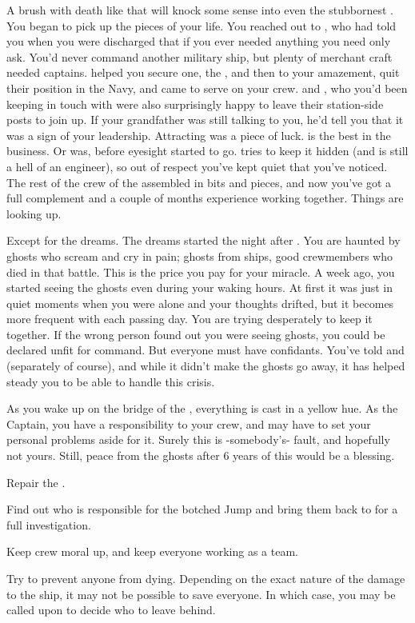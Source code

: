 \documentclass[char]{TMFHope}
\begin{document}
A brush with death like that will knock some sense into even the stubbornest \cCap{\human}. You began to pick up the pieces of your life. You reached out to \cXO{}, who had told you when you were discharged that if you ever needed anything you need only ask. You'd never command another military ship, but plenty of merchant craft needed captains. \cXO{} helped you secure one, the \pNew{}, and then to your amazement, quit their position in the Navy, and came to serve on your crew. \cMed{} and \cSci{}, who you'd been keeping in touch with were also surprisingly happy to leave their station-side posts to join up. If your grandfather was still talking to you, he'd tell you that it was a sign of your leadership. Attracting \cEng{} was a piece of luck. \cEng{\They} is the best in the business. Or was, before \cEng{\their} eyesight started to go. \cEng{} tries to keep it hidden (and \cEng{\they} is still a hell of an engineer), so out of respect you've kept quiet that you've noticed. The rest of the crew of the \pNew{} assembled in bits and pieces, and now you've got a full complement and a couple of months experience working together. Things are looking up.

Except for the dreams. The dreams started the night after \pBattle{}. You are haunted by ghosts who scream and cry in pain; ghosts from \pPlan{} ships, good crewmembers who died in that battle. This is the price you pay for your miracle.	A week ago, you started seeing the ghosts even during your waking hours. At first it was just in quiet moments when you were alone and your thoughts drifted, but it becomes more frequent with each passing day. You are trying desperately to keep it together. If the wrong person found out you were seeing ghosts, you could be declared unfit for command. But everyone must have confidants. You've told \cMed{} and \cSci{} (separately of course), and while it didn't make the ghosts go away, it has helped steady you to be able to handle this crisis. 

As you wake up on the bridge of the \pNew{}, everything is cast in a yellow hue. As the Captain, you have a responsibility to your crew, and may have to set your personal problems aside for it. Surely this is -somebody's- fault, and hopefully not yours. Still, peace from the ghosts after 6 years of this would be a blessing.

\begin{itemz}[Goals]
	\item Repair the \pNew{}.
	\item Find out who is responsible for the botched Jump and bring them back to \pHome{} for a full investigation.
	\item Keep crew moral up, and keep everyone working as a team.
	\item Try to prevent anyone from dying. Depending on the exact nature of the damage to the ship, it may not be possible to save everyone. In which case, you may be called upon to decide who to leave behind.
\end{itemz}
\end{document}

